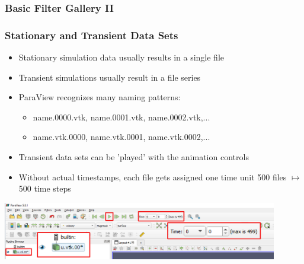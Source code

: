 \begin{frame}

  \frametitle{Basic Filter Gallery II}


\end{frame}

\begin{frame}
  \frametitle{Stationary and Transient Data Sets}
    \begin{itemize}
      \item Stationary simulation data usually results in a single file
      \item Transient simulations usually result in a file series 
      \item ParaView recognizes many naming patterns:
      \begin{itemize}
        \item name.0000.vtk, name.0001.vtk, name.0002.vtk,...
        \item name.vtk.0000, name.vtk.0001, name.vtk.0002,...				
      \end{itemize}	
      \item Transient data sets can be 'played' with the animation controls
      \item Without actual timestamps, each file gets assigned one time unit 500 files $\mapsto$ 500 time steps					
    \end{itemize}				
		\begin{center}
      \includegraphics[width=0.9\textwidth]{screenshots/transient.png}					
		\end{center}
\end{frame}

